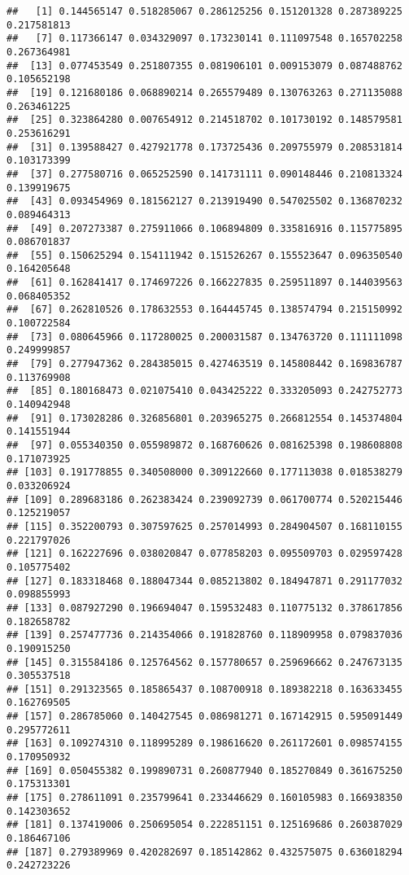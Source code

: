 \documentclass[
]{article}
\begin{document}
\begin{verbatim}
##   [1] 0.144565147 0.518285067 0.286125256 0.151201328 0.287389225 0.217581813
##   [7] 0.117366147 0.034329097 0.173230141 0.111097548 0.165702258 0.267364981
##  [13] 0.077453549 0.251807355 0.081906101 0.009153079 0.087488762 0.105652198
##  [19] 0.121680186 0.068890214 0.265579489 0.130763263 0.271135088 0.263461225
##  [25] 0.323864280 0.007654912 0.214518702 0.101730192 0.148579581 0.253616291
##  [31] 0.139588427 0.427921778 0.173725436 0.209755979 0.208531814 0.103173399
##  [37] 0.277580716 0.065252590 0.141731111 0.090148446 0.210813324 0.139919675
##  [43] 0.093454969 0.181562127 0.213919490 0.547025502 0.136870232 0.089464313
##  [49] 0.207273387 0.275911066 0.106894809 0.335816916 0.115775895 0.086701837
##  [55] 0.150625294 0.154111942 0.151526267 0.155523647 0.096350540 0.164205648
##  [61] 0.162841417 0.174697226 0.166227835 0.259511897 0.144039563 0.068405352
##  [67] 0.262810526 0.178632553 0.164445745 0.138574794 0.215150992 0.100722584
##  [73] 0.080645966 0.117280025 0.200031587 0.134763720 0.111111098 0.249999857
##  [79] 0.277947362 0.284385015 0.427463519 0.145808442 0.169836787 0.113769908
##  [85] 0.180168473 0.021075410 0.043425222 0.333205093 0.242752773 0.140942948
##  [91] 0.173028286 0.326856801 0.203965275 0.266812554 0.145374804 0.141551944
##  [97] 0.055340350 0.055989872 0.168760626 0.081625398 0.198608808 0.171073925
## [103] 0.191778855 0.340508000 0.309122660 0.177113038 0.018538279 0.033206924
## [109] 0.289683186 0.262383424 0.239092739 0.061700774 0.520215446 0.125219057
## [115] 0.352200793 0.307597625 0.257014993 0.284904507 0.168110155 0.221797026
## [121] 0.162227696 0.038020847 0.077858203 0.095509703 0.029597428 0.105775402
## [127] 0.183318468 0.188047344 0.085213802 0.184947871 0.291177032 0.098855993
## [133] 0.087927290 0.196694047 0.159532483 0.110775132 0.378617856 0.182658782
## [139] 0.257477736 0.214354066 0.191828760 0.118909958 0.079837036 0.190915250
## [145] 0.315584186 0.125764562 0.157780657 0.259696662 0.247673135 0.305537518
## [151] 0.291323565 0.185865437 0.108700918 0.189382218 0.163633455 0.162769505
## [157] 0.286785060 0.140427545 0.086981271 0.167142915 0.595091449 0.295772611
## [163] 0.109274310 0.118995289 0.198616620 0.261172601 0.098574155 0.170950932
## [169] 0.050455382 0.199890731 0.260877940 0.185270849 0.361675250 0.175313301
## [175] 0.278611091 0.235799641 0.233446629 0.160105983 0.166938350 0.142303652
## [181] 0.137419006 0.250695054 0.222851151 0.125169686 0.260387029 0.186467106
## [187] 0.279389969 0.420282697 0.185142862 0.432575075 0.636018294 0.242723226

\end{verbatim}
\end{document}
